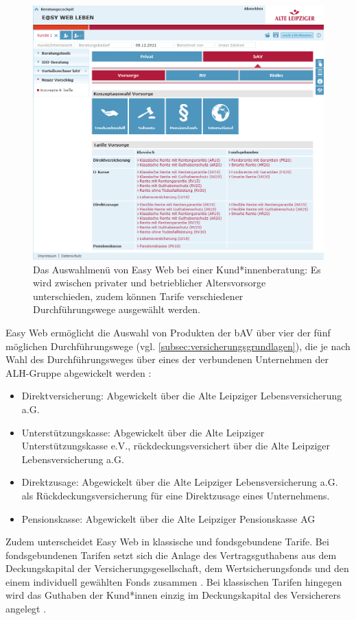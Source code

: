 \begin{figure}[t]
\centering
\includegraphics[width=0.7\columnwidth]{images/Easy_Web_Leben_Auswahl.png}
\caption{Das Auswahlmenü von Easy Web bei einer Kund*innenberatung: Es wird zwischen privater und betrieblicher Altersvorsorge unterschieden, zudem können Tarife verschiedener Durchführungswege ausgewählt werden.}
\label{fig:easyWebAuswahl}
\end{figure}

Easy Web ermöglicht die Auswahl von Produkten der bAV über vier der fünf möglichen Durchführungswege (vgl. \autoref{subsec:versicherungsgrundlagen}), die je nach Wahl des Durchführungsweges über eines der verbundenen Unternehmen der ALH-Gruppe abgewickelt werden \cite{alh_bav}:
\begin{itemize}
\item Direktversicherung: Abgewickelt über die Alte Leipziger Lebensversicherung a.G.
\item Unterstützungskasse: Abgewickelt über die Alte Leipziger Unterstützungskasse e.V., rückdeckungsversichert über die Alte Leipziger Lebensversicherung a.G.
\item Direktzusage: Abgewickelt über die Alte Leipziger Lebensversicherung a.G. als Rückdeckungsversicherung für eine Direktzusage eines Unternehmens.
\item Pensionskasse: Abgewickelt über die Alte Leipziger Pensionskasse AG
\end{itemize} 

Zudem unterscheidet Easy Web in klassische und fondsgebundene Tarife. Bei fondsgebundenen Tarifen setzt sich die Anlage des Vertragsguthabens aus dem Deckungskapital der Versicherungsgesellschaft, dem Wertsicherungsfonds und den einem individuell gewählten Fonds zusammen \cite{alh_produkte}. Bei klassischen Tarifen hingegen wird das Guthaben der Kund*innen einzig im Deckungskapital des Versicherers angelegt \cite{alh_produkte}.

